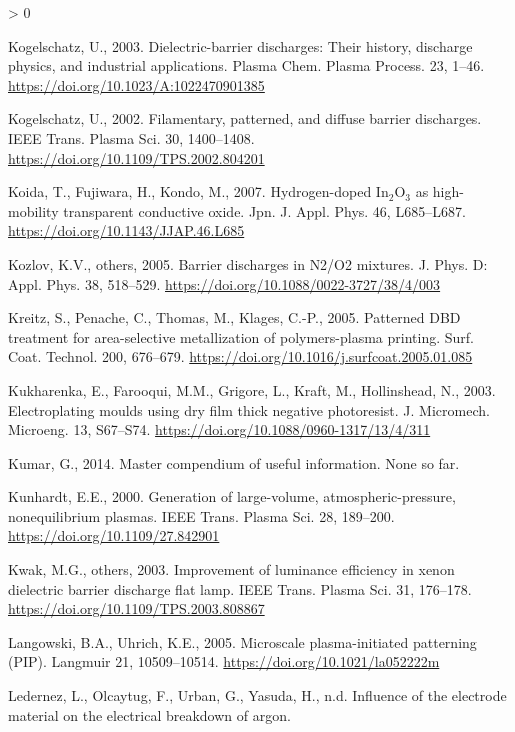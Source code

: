 \documentclass[
  11pt,
  twoside]{article}
\newlength{\cslhangindent}
\newenvironment{CSLReferences}[2] %
 {%
  \setlength{\parindent}{0pt}
  \ifodd #1 \everypar{\setlength{\hangindent}{\cslhangindent}}\ignorespaces\fi
  \ifnum #2 > 0
  \setlength{\parskip}{#2\baselineskip}
  \fi
 }%
 {}
\begin{document}
\begin{CSLReferences}{1}{0}
\leavevmode\hypertarget{ref-Kogel03}{}%
Kogelschatz, U., 2003. Dielectric-barrier discharges: Their history, discharge physics, and industrial applications. Plasma Chem. Plasma Process. 23, 1--46. \url{https://doi.org/10.1023/A:1022470901385}

\leavevmode\hypertarget{ref-Kogel02}{}%
Kogelschatz, U., 2002. Filamentary, patterned, and diffuse barrier discharges. IEEE Trans. Plasma Sci. 30, 1400--1408. \url{https://doi.org/10.1109/TPS.2002.804201}

\leavevmode\hypertarget{ref-Koid07}{}%
Koida, T., Fujiwara, H., Kondo, M., 2007. Hydrogen-doped \(\mathrm{In_{2}O_{3}}\) as high-mobility transparent conductive oxide. Jpn. J. Appl. Phys. 46, L685--L687. \url{https://doi.org/10.1143/JJAP.46.L685}

\leavevmode\hypertarget{ref-Kozl05}{}%
Kozlov, K.V., others, 2005. Barrier discharges in {N2/O}2 mixtures. J. Phys. D: Appl. Phys. 38, 518--529. \url{https://doi.org/10.1088/0022-3727/38/4/003}

\leavevmode\hypertarget{ref-Krei05}{}%
Kreitz, S., Penache, C., Thomas, M., Klages, C.-P., 2005. Patterned {DBD} treatment for area-selective metallization of polymers-plasma printing. Surf. Coat. Technol. 200, 676--679. \url{https://doi.org/10.1016/j.surfcoat.2005.01.085}

\leavevmode\hypertarget{ref-Kukh03}{}%
Kukharenka, E., Farooqui, M.M., Grigore, L., Kraft, M., Hollinshead, N., 2003. Electroplating moulds using dry film thick negative photoresist. J. Micromech. Microeng. 13, S67--S74. \url{https://doi.org/10.1088/0960-1317/13/4/311}

\leavevmode\hypertarget{ref-gopal2014}{}%
Kumar, G., 2014. Master compendium of useful information. None so far.

\leavevmode\hypertarget{ref-Kunh00}{}%
Kunhardt, E.E., 2000. Generation of large-volume, atmospheric-pressure, nonequilibrium plasmas. IEEE Trans. Plasma Sci. 28, 189--200. \url{https://doi.org/10.1109/27.842901}

\leavevmode\hypertarget{ref-Kwak03}{}%
Kwak, M.G., others, 2003. Improvement of luminance efficiency in xenon dielectric barrier discharge flat lamp. IEEE Trans. Plasma Sci. 31, 176--178. \url{https://doi.org/10.1109/TPS.2003.808867}

\leavevmode\hypertarget{ref-Lang05}{}%
Langowski, B.A., Uhrich, K.E., 2005. Microscale plasma-initiated patterning ({PIP}). Langmuir 21, 10509--10514. \url{https://doi.org/10.1021/la052222m}

\leavevmode\hypertarget{ref-Lede08}{}%
Ledernez, L., Olcaytug, F., Urban, G., Yasuda, H., n.d. Influence of the electrode material on the electrical breakdown of argon.


\end{CSLReferences}
\end{document}
